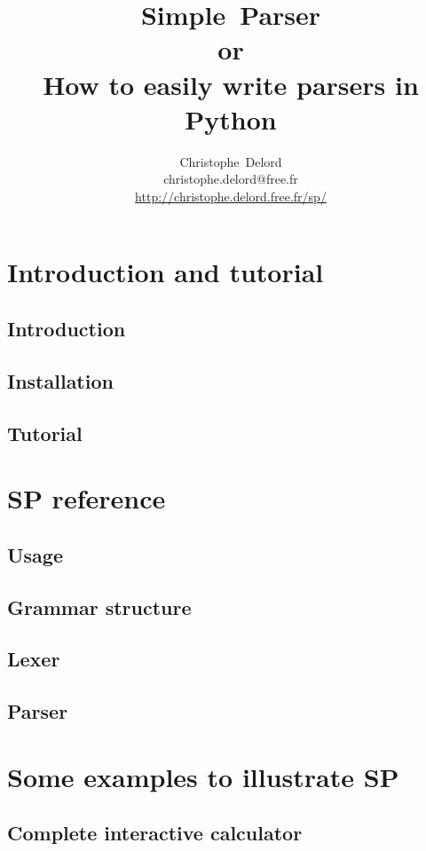 \documentclass[a4paper,twoside]{report}
\author{
    Christophe~Delord\\
    christophe.delord@free.fr \\
    \url{http://christophe.delord.free.fr/sp/} \\
}
\title{
    Simple~Parser \\
    or\\
    How to easily write parsers in Python \\
}
\begin{document}
\maketitle
\tableofcontents


\cleardoublepage
\part{Introduction and tutorial}                            \label{sp:intro}
    \chapter{Introduction}
        
    \chapter{Installation}
        
    \chapter{Tutorial}                                      \label{sp:tutorial}
        

\cleardoublepage
\part{SP reference}                                        \label{sp:core}
    \chapter{Usage}
        
    \chapter{Grammar structure}
        
    \chapter{Lexer}
        
    \chapter{Parser}
        

\cleardoublepage
\part{Some examples to illustrate SP}                       \label{sp:examples}
    \chapter{Complete interactive calculator}
        
\end{document}
